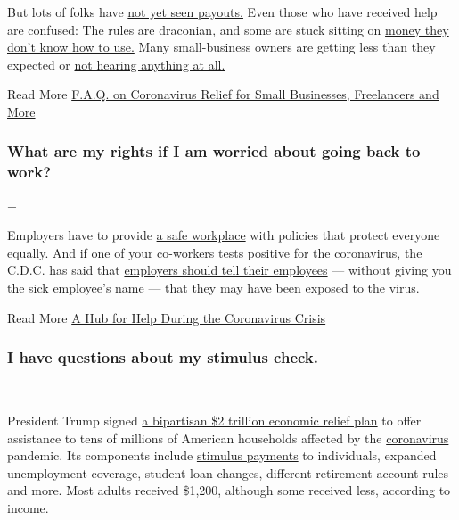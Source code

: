 But lots of folks have
\href{https://www.nytimes3xbfgragh.onion/interactive/2020/05/07/business/small-business-loans-coronavirus.html}{not
yet seen payouts.} Even those who have received help are confused: The
rules are draconian, and some are stuck sitting on
\href{https://www.nytimes3xbfgragh.onion/2020/05/02/business/economy/loans-coronavirus-small-business.html}{money
they don't know how to use.} Many small-business owners are getting less
than they expected or
\href{https://www.nytimes3xbfgragh.onion/2020/06/10/business/Small-business-loans-ppp.html}{not
hearing anything at all.}

Read More
\href{https://www.nytimes3xbfgragh.onion/article/small-business-loans-stimulus-grants-freelancers-coronavirus.html}{F.A.Q.
on Coronavirus Relief for Small Businesses, Freelancers and More}

\hypertarget{what-are-my-rights-if-i-am-worried-about-going-back-to-work}{%
\subsubsection{What are my rights if I am worried about going back to
work?}\label{what-are-my-rights-if-i-am-worried-about-going-back-to-work}}

+

Employers have to provide
\href{https://www.osha.gov/SLTC/covid-19/standards.html}{a safe
workplace} with policies that protect everyone equally. And if one of
your co-workers tests positive for the coronavirus, the C.D.C. has said
that
\href{https://www.cdc.gov/coronavirus/2019-ncov/community/guidance-business-response.html}{employers
should tell their employees} --- without giving you the sick employee's
name --- that they may have been exposed to the virus.

Read More
\href{https://www.nytimes3xbfgragh.onion/article/coronavirus-money-unemployment.html}{A
Hub for Help During the Coronavirus Crisis}

\hypertarget{i-have-questions-about-my-stimulus-check}{%
\subsubsection{I have questions about my stimulus
check.}\label{i-have-questions-about-my-stimulus-check}}

+

President Trump signed
\href{https://www.nytimes3xbfgragh.onion/2020/03/26/us/coronavirus-senate-stimulus-package.html}{a
bipartisan \$2 trillion economic relief plan} to offer assistance to
tens of millions of American households affected by the
\href{https://www.nytimes3xbfgragh.onion/2020/05/07/us/coronavirus-stimulus-package.html}{coronavirus}
pandemic. Its components include
\href{https://www.nytimes3xbfgragh.onion/2020/06/25/us/politics/coronavirus-stimulus-dead-people.html}{stimulus
payments} to individuals, expanded unemployment coverage, student loan
changes, different retirement account rules and more. Most adults
received \$1,200, although some received less, according to income.

